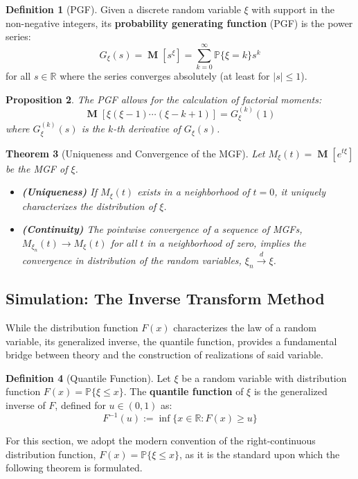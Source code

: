 \documentclass[12pt, openany]{book}
\theoremstyle{definition}
\newtheorem{definition}{Definition}[section]
\theoremstyle{plain}
\newtheorem{theorem}[definition]{Theorem}
\newtheorem{proposition}[definition]{Proposition}
\theoremstyle{remark}
\newcommand{\R}{\mathbb{R}}
\newcommand{\probP}{\mathbb{P}}
\DeclareMathOperator{\M}{\mathbf{M}} %
\begin{document}
\begin{definition}[PGF]
Given a discrete random variable $\xi$ with support in the non-negative integers, its \textbf{probability generating function} (PGF) is the power series:
$$ G_\xi(s) = \M[s^\xi] = \sum_{k=0}^\infty \probP\{\xi=k\}s^k $$
for all $s \in \R$ where the series converges absolutely (at least for $|s| \le 1$).
\end{definition}

\begin{proposition}
The PGF allows for the calculation of factorial moments:
$$ \M[\xi(\xi-1)\cdots(\xi-k+1)] = G_\xi^{(k)}(1) $$
where $G_\xi^{(k)}(s)$ is the $k$-th derivative of $G_\xi(s)$.
\end{proposition}

\begin{theorem}[Uniqueness and Convergence of the MGF]
Let $M_\xi(t) = \M[e^{t\xi}]$ be the MGF of $\xi$.
\begin{itemize}
    \item \textbf{(Uniqueness)} If $M_\xi(t)$ exists in a neighborhood of $t=0$, it uniquely characterizes the distribution of $\xi$.
    \item \textbf{(Continuity)} The pointwise convergence of a sequence of MGFs, $M_{\xi_n}(t) \to M_\xi(t)$ for all $t$ in a neighborhood of zero, implies the convergence in distribution of the random variables, $\xi_n \xrightarrow{d} \xi$.
\end{itemize}
\end{theorem}

\subsection{Simulation: The Inverse Transform Method}

While the distribution function $F(x)$ characterizes the law of a random variable, its generalized inverse, the quantile function, provides a fundamental bridge between theory and the construction of realizations of said variable.

\begin{definition}[Quantile Function]
Let $\xi$ be a random variable with distribution function $F(x) = \probP\{\xi \le x\}$. The \textbf{quantile function} of $\xi$ is the generalized inverse of $F$, defined for $u \in (0,1)$ as:
$$ F^{-1}(u) := \inf\{x \in \R : F(x) \ge u\} $$
\end{definition}

For this section, we adopt the modern convention of the right-continuous distribution function, $F(x) = \probP\{\xi \le x\}$, as it is the standard upon which the following theorem is formulated.
\end{document}
